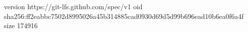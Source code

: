 version https://git-lfs.github.com/spec/v1
oid sha256:ff2eabbc7502d8995026a45b314885cad0930d69d5d99b696ead10b6ea0f6a4f
size 174916
